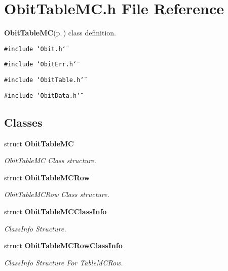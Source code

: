 \section{Obit\-Table\-MC.h File Reference}
\label{ObitTableMC_8h}
{\bf Obit\-Table\-MC}{\rm (p.\,\pageref{structObitTableMC})} class definition. 

{\tt \#include \char`\"{}Obit.h\char`\"{}}\par
{\tt \#include \char`\"{}Obit\-Err.h\char`\"{}}\par
{\tt \#include \char`\"{}Obit\-Table.h\char`\"{}}\par
{\tt \#include \char`\"{}Obit\-Data.h\char`\"{}}\par
\subsection*{Classes}
\begin{CompactItemize}
\item 
struct {\bf Obit\-Table\-MC}
\begin{CompactList}\small\item\em Obit\-Table\-MC Class structure. \item\end{CompactList}\item 
struct {\bf Obit\-Table\-MCRow}
\begin{CompactList}\small\item\em Obit\-Table\-MCRow Class structure. \item\end{CompactList}\item 
struct {\bf Obit\-Table\-MCClass\-Info}
\begin{CompactList}\small\item\em Class\-Info Structure. \item\end{CompactList}\item 
struct {\bf Obit\-Table\-MCRow\-Class\-Info}
\begin{CompactList}\small\item\em Class\-Info Structure For Table\-MCRow. \item\end{CompactList}\end{CompactItemize}
